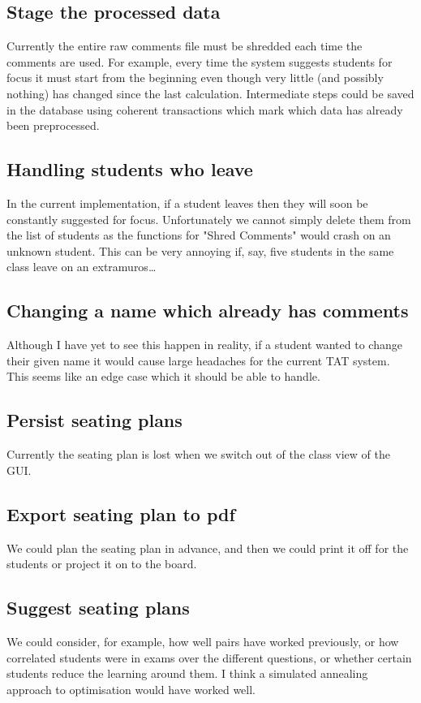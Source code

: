 \documentclass[10pt]{article}
\begin{document}
\subsection{Stage the processed data}
Currently the entire raw comments file must be shredded each time the comments are used. For example, every time the system suggests students for focus it must start from the beginning even though very little (and possibly nothing) has changed since the last calculation. Intermediate steps could be saved in the database using coherent transactions which mark which data has already been preprocessed.

\subsection{Handling students who leave}
In the current implementation, if a student leaves then they will soon be constantly suggested for focus. Unfortunately we cannot simply delete them from the list of students as the functions for "Shred Comments" would crash on an unknown student. This can be very annoying if, say, five students in the same class leave on an extramuros\ldots

\subsection{Changing a name which already has comments}
Although I have yet to see this happen in reality, if a student wanted to change their given name it would cause large headaches for the current TAT system. This seems like an edge case which it should be able to handle.

\subsection{Persist seating plans}
Currently the seating plan is lost when we switch out of the class view of the GUI.

\subsection{Export seating plan to pdf}
We could plan the seating plan in advance, and then we could print it off for the students or project it on to the board.

\subsection{Suggest seating plans}
We could consider, for example, how well pairs have worked previously, or how correlated students were in exams over the different questions, or whether certain students reduce the learning around them. I think a simulated annealing approach to optimisation would have worked well.
\end{document}
